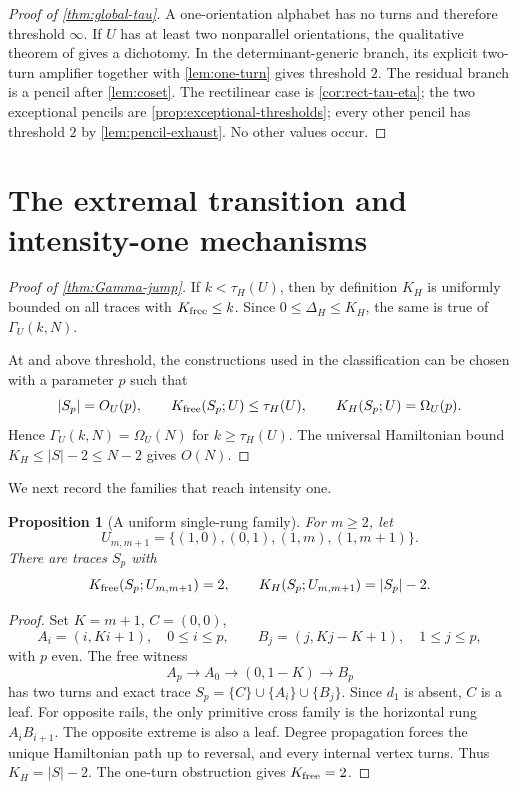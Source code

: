 \documentclass[11pt]{article}
\newtheorem{proposition}[theorem]{Proposition}
\theoremstyle{definition}
\begin{document}
\begin{proof}[Proof of \cref{thm:global-tau}]
A one-orientation alphabet has no turns and therefore threshold $\infty$.  If $U$ has at least two nonparallel orientations, the qualitative theorem of \cite{RosalesPaperIIII} gives a dichotomy.  In the determinant-generic branch, its explicit two-turn amplifier together with \cref{lem:one-turn} gives threshold $2$.  The residual branch is a pencil after \cref{lem:coset}.  The rectilinear case is \cref{cor:rect-tau-eta}; the two exceptional pencils are \cref{prop:exceptional-thresholds}; every other pencil has threshold $2$ by \cref{lem:pencil-exhaust}.  No other values occur.
\end{proof}

\section{The extremal transition and intensity-one mechanisms}\label{sec:extremal}
\begin{proof}[Proof of \cref{thm:Gamma-jump}]
If $k<\tau_H(U)$, then by definition $K_H$ is uniformly bounded on all traces with $K_{\rm free}\le k$.  Since $0\le\Delta_H\le K_H$, the same is true of $\Gamma_U(k,N)$.

At and above threshold, the constructions used in the classification can be chosen with a parameter $p$ such that
\[
|S_p|=O_U(p),\qquad K_{\rm free}(S_p;U)\le\tau_H(U),\qquad K_H(S_p;U)=\Omega_U(p).
\]
Hence $\Gamma_U(k,N)=\Omega_U(N)$ for $k\ge\tau_H(U)$.  The universal Hamiltonian bound $K_H\le |S|-2\le N-2$ gives $O(N)$.
\end{proof}

We next record the families that reach intensity one.

\begin{proposition}[A uniform single-rung family]\label{prop:single-rung-pencil}
For $m\ge2$, let
\[
U_{m,m+1}=\{(1,0),(0,1),(1,m),(1,m+1)\}.
\]
There are traces $S_p$ with
\[
K_{\rm free}(S_p;U_{m,m+1})=2,
\qquad
K_H(S_p;U_{m,m+1})=|S_p|-2.
\]
\end{proposition}
\begin{proof}
Set $K=m+1$, $C=(0,0)$,
\[
A_i=(i,Ki+1),\quad0\le i\le p,
\qquad
B_j=(j,Kj-K+1),\quad1\le j\le p,
\]
with $p$ even.  The free witness
\[
A_p\to A_0\to(0,1-K)\to B_p
\]
has two turns and exact trace $S_p=\{C\}\cup\{A_i\}\cup\{B_j\}$.  Since $d_1$ is absent, $C$ is a leaf.  For opposite rails, the only primitive cross family is the horizontal rung $A_iB_{i+1}$.  The opposite extreme is also a leaf.  Degree propagation forces the unique Hamiltonian path up to reversal, and every internal vertex turns.  Thus $K_H=|S|-2$.  The one-turn obstruction gives $K_{\rm free}=2$.
\end{proof}
\end{document}
